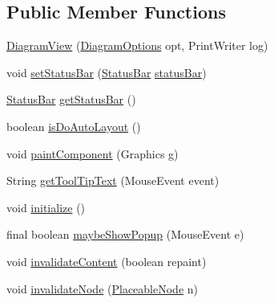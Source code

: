 \subsection*{Public Member Functions}
\begin{DoxyCompactItemize}
\item 
\hyperlink{classorg_1_1tzi_1_1use_1_1gui_1_1views_1_1diagrams_1_1_diagram_view_a7e53f8b2200bfe08d72795712f9ed37c}{Diagram\-View} (\hyperlink{classorg_1_1tzi_1_1use_1_1gui_1_1views_1_1diagrams_1_1_diagram_options}{Diagram\-Options} opt, Print\-Writer log)
\item 
void \hyperlink{classorg_1_1tzi_1_1use_1_1gui_1_1views_1_1diagrams_1_1_diagram_view_ab61037435d72c819255cba12bc902edd}{set\-Status\-Bar} (\hyperlink{classorg_1_1tzi_1_1use_1_1gui_1_1util_1_1_status_bar}{Status\-Bar} \hyperlink{classorg_1_1tzi_1_1use_1_1gui_1_1views_1_1diagrams_1_1_diagram_view_a8889eaf20740f2bbb309905949a82dc3}{status\-Bar})
\item 
\hyperlink{classorg_1_1tzi_1_1use_1_1gui_1_1util_1_1_status_bar}{Status\-Bar} \hyperlink{classorg_1_1tzi_1_1use_1_1gui_1_1views_1_1diagrams_1_1_diagram_view_aac8fed84dffdfa219d611f0bff7eee64}{get\-Status\-Bar} ()
\item 
boolean \hyperlink{classorg_1_1tzi_1_1use_1_1gui_1_1views_1_1diagrams_1_1_diagram_view_a0f66d5aeaf9874b964805e9a771daf9e}{is\-Do\-Auto\-Layout} ()
\item 
void \hyperlink{classorg_1_1tzi_1_1use_1_1gui_1_1views_1_1diagrams_1_1_diagram_view_af2fbd6379f6357a44d995dd68782ea5e}{paint\-Component} (Graphics g)
\item 
String \hyperlink{classorg_1_1tzi_1_1use_1_1gui_1_1views_1_1diagrams_1_1_diagram_view_af6b50f0dad6ee582a5dad302b7a65f32}{get\-Tool\-Tip\-Text} (Mouse\-Event event)
\item 
void \hyperlink{classorg_1_1tzi_1_1use_1_1gui_1_1views_1_1diagrams_1_1_diagram_view_a409666b0d36ef2c4c7b63190bc832eee}{initialize} ()
\item 
final boolean \hyperlink{classorg_1_1tzi_1_1use_1_1gui_1_1views_1_1diagrams_1_1_diagram_view_a5405e29dd4383dfdbaea5065cfd322fe}{maybe\-Show\-Popup} (Mouse\-Event e)
\item 
void \hyperlink{classorg_1_1tzi_1_1use_1_1gui_1_1views_1_1diagrams_1_1_diagram_view_a13ba9020d3301a88b396d410d80eab6f}{invalidate\-Content} (boolean repaint)
\item 
void \hyperlink{classorg_1_1tzi_1_1use_1_1gui_1_1views_1_1diagrams_1_1_diagram_view_aa0b36b35fd0096dfc842c158564744dc}{invalidate\-Node} (\hyperlink{classorg_1_1tzi_1_1use_1_1gui_1_1views_1_1diagrams_1_1elements_1_1_placeable_node}{Placeable\-Node} n)

\end{DoxyCompactItemize}
